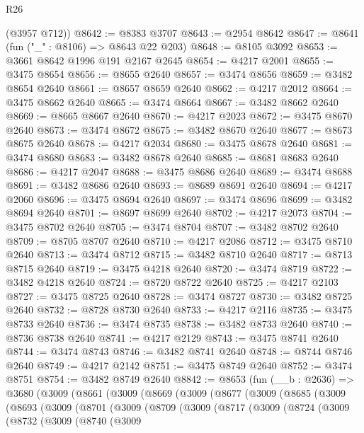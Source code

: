 \begin{lexlean}{R26}
\begin{coremodule}
      (@3957 @712))
@8642 := @8383 @3707
@8643 := @2954 @8642
@8647 := @8641 (fun ("_" : @8106) => @8643 @22 @203)
@8648 := @8105 @3092
@8653 := @3661 @8642 @1996 @191 @2167 @2645
@8654 := @4217 @2001
@8655 := @3475 @8654
@8656 := @8655 @2640
@8657 := @3474 @8656
@8659 := @3482 @8654 @2640
@8661 := @8657 @8659 @2640
@8662 := @4217 @2012
@8664 := @3475 @8662 @2640
@8665 := @3474 @8664
@8667 := @3482 @8662 @2640
@8669 := @8665 @8667 @2640
@8670 := @4217 @2023
@8672 := @3475 @8670 @2640
@8673 := @3474 @8672
@8675 := @3482 @8670 @2640
@8677 := @8673 @8675 @2640
@8678 := @4217 @2034
@8680 := @3475 @8678 @2640
@8681 := @3474 @8680
@8683 := @3482 @8678 @2640
@8685 := @8681 @8683 @2640
@8686 := @4217 @2047
@8688 := @3475 @8686 @2640
@8689 := @3474 @8688
@8691 := @3482 @8686 @2640
@8693 := @8689 @8691 @2640
@8694 := @4217 @2060
@8696 := @3475 @8694 @2640
@8697 := @3474 @8696
@8699 := @3482 @8694 @2640
@8701 := @8697 @8699 @2640
@8702 := @4217 @2073
@8704 := @3475 @8702 @2640
@8705 := @3474 @8704
@8707 := @3482 @8702 @2640
@8709 := @8705 @8707 @2640
@8710 := @4217 @2086
@8712 := @3475 @8710 @2640
@8713 := @3474 @8712
@8715 := @3482 @8710 @2640
@8717 := @8713 @8715 @2640
@8719 := @3475 @4218 @2640
@8720 := @3474 @8719
@8722 := @3482 @4218 @2640
@8724 := @8720 @8722 @2640
@8725 := @4217 @2103
@8727 := @3475 @8725 @2640
@8728 := @3474 @8727
@8730 := @3482 @8725 @2640
@8732 := @8728 @8730 @2640
@8733 := @4217 @2116
@8735 := @3475 @8733 @2640
@8736 := @3474 @8735
@8738 := @3482 @8733 @2640
@8740 := @8736 @8738 @2640
@8741 := @4217 @2129
@8743 := @3475 @8741 @2640
@8744 := @3474 @8743
@8746 := @3482 @8741 @2640
@8748 := @8744 @8746 @2640
@8749 := @4217 @2142
@8751 := @3475 @8749 @2640
@8752 := @3474 @8751
@8754 := @3482 @8749 @2640
@8842 := @8653
    (fun (__b : @2636) =>
    @3680
      (@3009
        (@8661
          (@3009
            (@8669
              (@3009
                (@8677
                  (@3009
                    (@8685
                      (@3009
                        (@8693
                          (@3009
                            (@8701
                              (@3009
                                (@8709
                                  (@3009
                                    (@8717
                                      (@3009
                                        (@8724
                                          (@3009
                                            (@8732
                                              (@3009
                                                (@8740
                                                  (@3009

\end{coremodule}
\end{lexlean}
